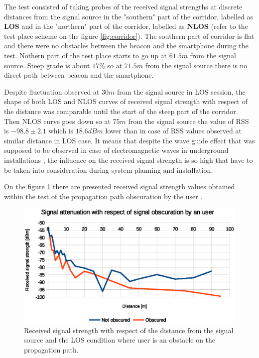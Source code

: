 \documentclass[../main.tex]{subfiles}
\begin{document}
The test consisted of taking probes of the received signal strengths at discrete distances from the signal source in the "southern" part of the corridor, labelled as \textbf{LOS} and in the "northern" part of the corridor, labelled as \textbf{NLOS} (refer to the test place scheme on the figure \ref{fig:corridor}). The southern part of corridor is flat and there were no obstacles between the beacon and the smartphone during the test. Nothern part of the test place starts to go up at $61.5 m$ from the signal source. Steep grade is about $17\%$ so at $71.5 m$ from the signal source there is no direct path between beacon and the smartphone.

Despite fluctuation observed at $30 m$ from the signal source in LOS session, the shape of both LOS and NLOS curves of received signal strength with respect of the distance was comparable until the start of the steep part of the corridor. Then NLOS curve goes down so at $75m$ from the signal source the value of RSS is $-98.8\pm2.1$ which is $18.6dBm$ lower than in case of RSS values observed at similar distance in LOS case. It means that despite the wave guide effect that was supposed to be observed in case of electromagnetic waves in underground installations \cite{rf_in_tunnel_waveguide_effect}\cite{article_rf_propagation_practical_full}, the influence on the received signal strength is so high that have to be taken into consideration during system planning and installation.

On the figure \ref{fig:tests_case5_user_shadowing} there are presented received signal strength values obtained within the test of the propagation path obscuration by the user .

\begin{figure}[!htbp]
\includegraphics[width=\textwidth, keepaspectratio]{pictures/tests_case5_user_shadowing}
\centering
\caption{Received signal strength with respect of the distance from the signal source and the LOS condition where user is an obstacle on the propagation path.}
\label{fig:tests_case5_user_shadowing}
\end{figure}
\end{document}

